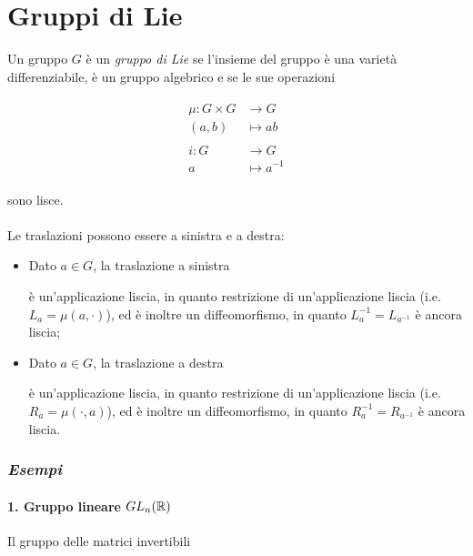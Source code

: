 \section{Gruppi di Lie}

Un gruppo $ G $ è un \textit{gruppo di Lie} se l'insieme del gruppo è una varietà differenziabile, è un gruppo algebrico e se le sue operazioni

\begin{align}
	\begin{split}
		\mu : G \times G &\to G\\
		(a,b) &\mapsto a b\\\\
		i : G &\to G\\
		a &\mapsto a^{-1}
	\end{split}
\end{align}

sono lisce.\\\\
%
Le traslazioni possono essere a sinistra e a destra:

\begin{itemize}
	\item Dato $ a \in G $, la traslazione a sinistra
	
	
	è un'applicazione liscia, in quanto restrizione di un'applicazione liscia (i.e. $ L_{a} = \mu(a,\cdot) $), ed è inoltre un diffeomorfismo, in quanto $ L_{a}^{-1} = L_{a^{-1}} $ è ancora liscia;
	
	\item Dato $ a \in G $, la traslazione a destra
	
	
	è un'applicazione liscia, in quanto restrizione di un'applicazione liscia (i.e. $ R_{a} = \mu(\cdot,a) $), ed è inoltre un diffeomorfismo, in quanto $ R_{a}^{-1} = R_{a^{-1}} $ è ancora liscia.
\end{itemize}

\subsubsection{\textit{Esempi}}

\paragraph{1. Gruppo lineare $ GL_{n}(\mathbb{R}) $}

Il gruppo delle matrici invertibili

